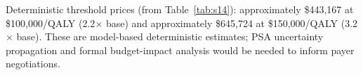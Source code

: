 \noindent Deterministic threshold prices (from Table~\ref{tab:s14}): approximately \$443,167 at \$100,000/QALY (2.2$\times$ base) and approximately \$645,724 at \$150,000/QALY (3.2$\times$ base). These are model-based deterministic estimates; PSA uncertainty propagation and formal budget-impact analysis would be needed to inform payer negotiations.
